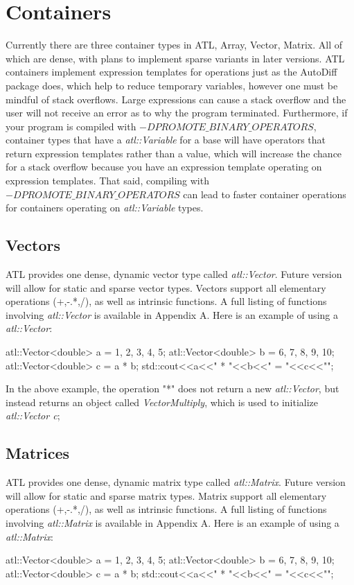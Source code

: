 \documentclass[12pt,a4paper]{article}
\begin{document}
\section{Containers}
Currently there are three container types in ATL, Array, Vector, Matrix. All of which are dense, with plans to implement sparse variants in later versions. ATL containers implement expression templates for operations just as the AutoDiff package does, which help to reduce temporary variables, however one must be mindful of stack overflows. Large expressions can cause a stack overflow and the user will not receive an error as to why the program terminated. Furthermore, if your program is compiled with \textit{$-DPROMOTE\_BINARY\_OPERATORS$}, container types that have a \textit{atl::Variable} for a base will have operators that return expression templates rather than a value, which will increase the chance for a stack overflow because you have an expression template operating on expression templates. That said, compiling with \textit{$-DPROMOTE\_BINARY\_OPERATORS$} can lead to faster container operations for containers operating on \textit{atl::Variable} types.
\subsection{Vectors}
ATL provides one dense, dynamic vector type called \textit{atl::Vector}. Future version will allow for static and sparse vector types. Vectors support all elementary operations (+,-.*,/), as well as intrinsic functions. A full listing of functions involving \textit{atl::Vector} is available in Appendix A. Here is an example of using a \textit{atl::Vector}:
\begin{cppsource}

    atl::Vector<double> a = {1, 2, 3, 4, 5};
    atl::Vector<double> b = {6, 7, 8, 9, 10};
    atl::Vector<double> c = a * b;
    std::cout<<a<<" * "<<b<<" = "<<c<<"\n";
  
\end{cppsource}
In the above example, the operation "*" does not return a new \textit{atl::Vector}, but instead returns an object called \textit{VectorMultiply}, which is used to initialize \textit{atl::Vector c};

\subsection{Matrices}
ATL provides one dense, dynamic matrix type called \textit{atl::Matrix}. Future version will allow for static and sparse matrix types. Matrix support all elementary operations (+,-.*,/), as well as intrinsic functions. A full listing of functions involving \textit{atl::Matrix} is available in Appendix A. Here is an example of using a \textit{atl::Matrix}:
\begin{cppsource}

    atl::Vector<double> a = {1, 2, 3, 4, 5};
    atl::Vector<double> b = {6, 7, 8, 9, 10};
    atl::Vector<double> c = a * b;
    std::cout<<a<<" * "<<b<<" = "<<c<<"\n";
  
\end{cppsource}
\end{document}
